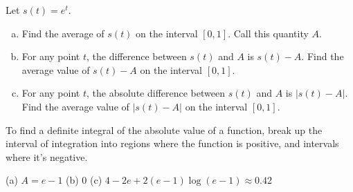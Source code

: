 

\begin{question}\label{prob_s2.2:var}
Let $s(t) = e^t$.
\begin{enumerate}[(a)]
\item Find the average of $s(t)$ on the interval $[0,1]$. Call this quantity $A$.
\item For any point $t$, the difference between $s(t)$ and $A$ is $s(t)-A$. Find the average value of $s(t)-A$ on the interval $[0,1]$.
\item For any point $t$, the  absolute difference between $s(t)$ and $A$ is $|s(t)-A|$. Find the average value of $|s(t)-A|$ on the interval $[0,1]$.
\end{enumerate}
\end{question}
\begin{hint}
To find a definite integral of the absolute value of a function, break up the interval of integration into regions where the function is positive, and intervals where it's negative.
\end{hint}
\begin{answer}
(a) $A=e-1$ \qquad (b) 0 \qquad (c) $\displaystyle4-2e+2(e-1)\log(e-1)
\approx 0.42$
\end{answer}
